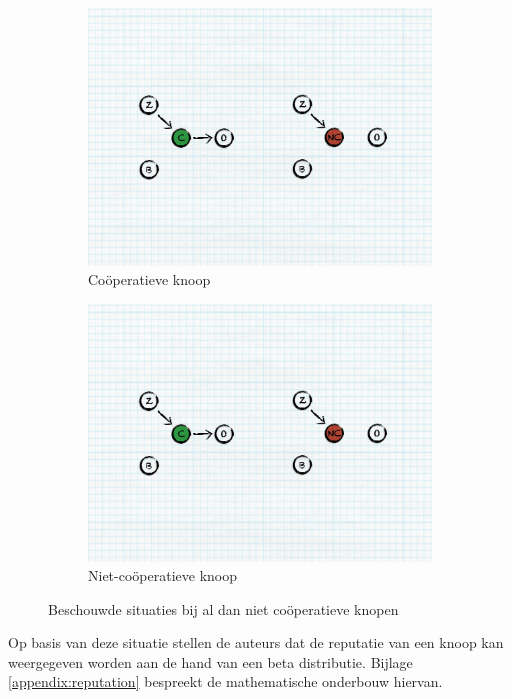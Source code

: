 \begin{figure}
\centering
\begin{subfigure}{.49\textwidth}
\centering
  \includegraphics[width=.8\linewidth]{./resources/cooperative.pdf}
  \caption{Co\"operatieve knoop}
  \label{fig:reputation-cooperative-node}
\end{subfigure}
\begin{subfigure}{.49\textwidth}
\centering
  \includegraphics[width=.8\linewidth]{./resources/non-cooperative.pdf}
  \caption{Niet-co\"operatieve knoop}
  \label{fig:reputation-uncooperative-node}
\end{subfigure}
\caption{Beschouwde situaties bij al dan niet co\"operatieve knopen}
\label{fig:reputation-cooperation}
\end{figure}

Op basis van deze situatie stellen de auteurs dat de reputatie van een knoop
kan weergegeven worden aan de hand van een beta distributie. Bijlage
\ref{appendix:reputation} bespreekt de mathematische onderbouw hiervan.

